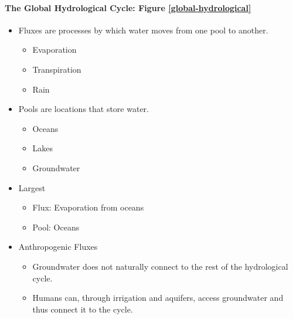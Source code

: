 \documentclass[12pt]{article}
\begin{document}
\paragraph{The Global Hydrological Cycle: Figure \ref{global-hydrological}}
\begin{itemize}
    \item Fluxes are processes by which water moves from one pool to another.
          \begin{itemize}
              \item Evaporation
              \item Transpiration
              \item Rain
          \end{itemize}
    \item Pools are locations that store water.
          \begin{itemize}
              \item Oceans
              \item Lakes
              \item Groundwater
          \end{itemize}
    \item Largest
          \begin{itemize}
              \item Flux: Evaporation from oceans
              \item Pool: Oceans
          \end{itemize}
    \item Anthropogenic Fluxes
          \begin{itemize}
              \item Groundwater does not naturally connect to the rest of the hydrological cycle.
              \item Humans can, through irrigation and aquifers, access groundwater and thus connect it to the cycle.
          \end{itemize}
\end{itemize}
\end{document}
